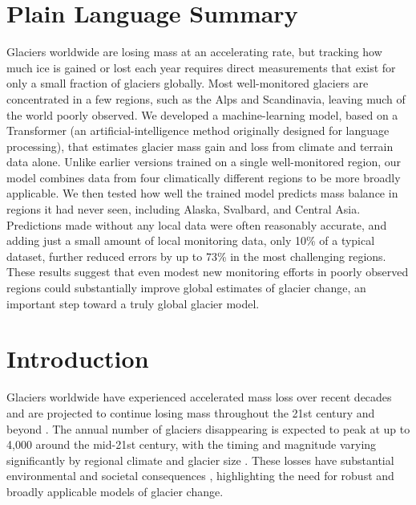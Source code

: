 \documentclass[draft]{agujournal2019}
\begin{document}
\section*{Plain Language Summary}
Glaciers worldwide are losing mass at an accelerating rate, but tracking how much ice is gained or lost each year requires direct measurements that exist for only a small fraction of glaciers globally. Most well-monitored glaciers are concentrated in a few regions, such as the Alps and Scandinavia, leaving much of the world poorly observed. We developed a machine-learning model, based on a Transformer (an artificial-intelligence method originally designed for language processing), that estimates glacier mass gain and loss from climate and terrain data alone. Unlike earlier versions trained on a single well-monitored region, our model combines data from four climatically different regions to be more broadly applicable. We then tested how well the trained model predicts mass balance in regions it had never seen, including Alaska, Svalbard, and Central Asia. Predictions made without any local data were often reasonably accurate, and adding just a small amount of local monitoring data, only 10\% of a typical dataset, further reduced errors by up to 73\% in the most challenging regions. These results suggest that even modest new monitoring efforts in poorly observed regions could substantially improve global estimates of glacier change, an important step toward a truly global glacier model.

\section{Introduction}\label{sec:introduction}
Glaciers worldwide have experienced accelerated mass loss over recent decades \citep[e.g.,][]{Jakob_2023, Dussaillant_2025, GlaMBIE_2025} and are projected to continue losing mass throughout the 21st century and beyond \citep[e.g.,][]{Rounce_2023, Zekollari_2024, Schuster_2025}. The annual number of glaciers disappearing is expected to peak at up to 4,000 around the mid-21st century, with the timing and magnitude varying significantly by regional climate and glacier size \citep{VanTricht2026}. These losses have substantial environmental and societal consequences \citep{IPCC2023}, highlighting the need for robust and broadly applicable models of glacier change. 
\end{document}
